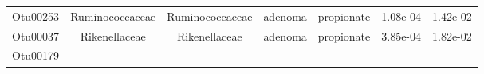 \documentclass[11pt,]{article}
\begin{document}
\begin{longtable}[]{@{}ccccccc@{}}
\begin{minipage}[t]{0.09\columnwidth}\centering\strut
Otu00253\strut
\end{minipage} & \begin{minipage}[t]{0.17\columnwidth}\centering\strut
Ruminococcaceae\strut
\end{minipage} & \begin{minipage}[t]{0.17\columnwidth}\centering\strut
Ruminococcaceae\strut
\end{minipage} & \begin{minipage}[t]{0.09\columnwidth}\centering\strut
adenoma\strut
\end{minipage} & \begin{minipage}[t]{0.11\columnwidth}\centering\strut
propionate\strut
\end{minipage} & \begin{minipage}[t]{0.09\columnwidth}\centering\strut
1.08e-04\strut
\end{minipage} & \begin{minipage}[t]{0.09\columnwidth}\centering\strut
1.42e-02\strut
\end{minipage}\tabularnewline
\begin{minipage}[t]{0.09\columnwidth}\centering\strut
Otu00037\strut
\end{minipage} & \begin{minipage}[t]{0.17\columnwidth}\centering\strut
Rikenellaceae\strut
\end{minipage} & \begin{minipage}[t]{0.17\columnwidth}\centering\strut
Rikenellaceae\strut
\end{minipage} & \begin{minipage}[t]{0.09\columnwidth}\centering\strut
adenoma\strut
\end{minipage} & \begin{minipage}[t]{0.11\columnwidth}\centering\strut
propionate\strut
\end{minipage} & \begin{minipage}[t]{0.09\columnwidth}\centering\strut
3.85e-04\strut
\end{minipage} & \begin{minipage}[t]{0.09\columnwidth}\centering\strut
1.82e-02\strut
\end{minipage}\tabularnewline
\begin{minipage}[t]{0.09\columnwidth}\centering\strut
Otu00179\strut
\end{minipage} & \begin{minipage}[t]{0.17\columnwidth}\centering\strut

\end{minipage}
\end{longtable}
\end{document}
